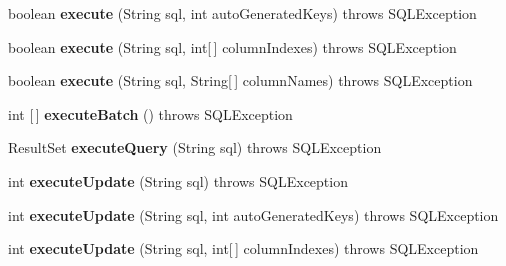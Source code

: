 \begin{DoxyCompactItemize}
\item 
\mbox{\label{classsimpledb_1_1jdbc_1_1StatementAdapter_a58f9cf5d1e903f0734b599db555a40eb}} 
boolean {\bfseries execute} (String sql, int auto\+Generated\+Keys)  throws S\+Q\+L\+Exception 
\item 
\mbox{\label{classsimpledb_1_1jdbc_1_1StatementAdapter_a93471303e7d6b831f4d9cfbe014249c2}} 
boolean {\bfseries execute} (String sql, int\mbox{[}$\,$\mbox{]} column\+Indexes)  throws S\+Q\+L\+Exception 
\item 
\mbox{\label{classsimpledb_1_1jdbc_1_1StatementAdapter_a2722323171769c944a099ecb70599a41}} 
boolean {\bfseries execute} (String sql, String\mbox{[}$\,$\mbox{]} column\+Names)  throws S\+Q\+L\+Exception 
\item 
\mbox{\label{classsimpledb_1_1jdbc_1_1StatementAdapter_af82f9f85d97d0b613a8a8d048438d372}} 
int \mbox{[}$\,$\mbox{]} {\bfseries execute\+Batch} ()  throws S\+Q\+L\+Exception 
\item 
\mbox{\label{classsimpledb_1_1jdbc_1_1StatementAdapter_ae90479c85cd87ab8437aaa43dbdd0c79}} 
Result\+Set {\bfseries execute\+Query} (String sql)  throws S\+Q\+L\+Exception 
\item 
\mbox{\label{classsimpledb_1_1jdbc_1_1StatementAdapter_a2db4be3033d0f5d2bf3b3694e4833479}} 
int {\bfseries execute\+Update} (String sql)  throws S\+Q\+L\+Exception 
\item 
\mbox{\label{classsimpledb_1_1jdbc_1_1StatementAdapter_a2676931c5539d24293a4f780d576b6ee}} 
int {\bfseries execute\+Update} (String sql, int auto\+Generated\+Keys)  throws S\+Q\+L\+Exception 
\item 
\mbox{\label{classsimpledb_1_1jdbc_1_1StatementAdapter_a426cc0174a95bb913507ee342cff37eb}} 
int {\bfseries execute\+Update} (String sql, int\mbox{[}$\,$\mbox{]} column\+Indexes)  throws S\+Q\+L\+Exception 
\item 

\end{DoxyCompactItemize}
